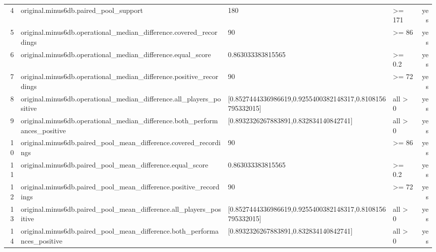 \documentclass{article}
\begin{document}
\begin{longtable}{r p{5cm} p{4cm} p{2.5cm} r}
4 & original.\allowbreak{}minus6db.\allowbreak{}paired\_\allowbreak{}pool\_\allowbreak{}support & 180 & >= 171 & yes \\
5 & original.\allowbreak{}minus6db.\allowbreak{}operational\_\allowbreak{}median\_\allowbreak{}difference.\allowbreak{}covered\_\allowbreak{}recordings & 90 & >= 86 & yes \\
6 & original.\allowbreak{}minus6db.\allowbreak{}operational\_\allowbreak{}median\_\allowbreak{}difference.\allowbreak{}equal\_\allowbreak{}score & 0.\allowbreak{}863033383815565 & >= 0.\allowbreak{}2 & yes \\
7 & original.\allowbreak{}minus6db.\allowbreak{}operational\_\allowbreak{}median\_\allowbreak{}difference.\allowbreak{}positive\_\allowbreak{}recordings & 90 & >= 72 & yes \\
8 & original.\allowbreak{}minus6db.\allowbreak{}operational\_\allowbreak{}median\_\allowbreak{}difference.\allowbreak{}all\_\allowbreak{}players\_\allowbreak{}positive & [0.\allowbreak{}8527444336986619,\allowbreak{}0.\allowbreak{}9255400382148317,\allowbreak{}0.\allowbreak{}8108156795332015] & all > 0 & yes \\
9 & original.\allowbreak{}minus6db.\allowbreak{}operational\_\allowbreak{}median\_\allowbreak{}difference.\allowbreak{}both\_\allowbreak{}performances\_\allowbreak{}positive & [0.\allowbreak{}8932326267883891,\allowbreak{}0.\allowbreak{}832834140842741] & all > 0 & yes \\
10 & original.\allowbreak{}minus6db.\allowbreak{}paired\_\allowbreak{}pool\_\allowbreak{}mean\_\allowbreak{}difference.\allowbreak{}covered\_\allowbreak{}recordings & 90 & >= 86 & yes \\
11 & original.\allowbreak{}minus6db.\allowbreak{}paired\_\allowbreak{}pool\_\allowbreak{}mean\_\allowbreak{}difference.\allowbreak{}equal\_\allowbreak{}score & 0.\allowbreak{}863033383815565 & >= 0.\allowbreak{}2 & yes \\
12 & original.\allowbreak{}minus6db.\allowbreak{}paired\_\allowbreak{}pool\_\allowbreak{}mean\_\allowbreak{}difference.\allowbreak{}positive\_\allowbreak{}recordings & 90 & >= 72 & yes \\
13 & original.\allowbreak{}minus6db.\allowbreak{}paired\_\allowbreak{}pool\_\allowbreak{}mean\_\allowbreak{}difference.\allowbreak{}all\_\allowbreak{}players\_\allowbreak{}positive & [0.\allowbreak{}8527444336986619,\allowbreak{}0.\allowbreak{}9255400382148317,\allowbreak{}0.\allowbreak{}8108156795332015] & all > 0 & yes \\
14 & original.\allowbreak{}minus6db.\allowbreak{}paired\_\allowbreak{}pool\_\allowbreak{}mean\_\allowbreak{}difference.\allowbreak{}both\_\allowbreak{}performances\_\allowbreak{}positive & [0.\allowbreak{}8932326267883891,\allowbreak{}0.\allowbreak{}832834140842741] & all > 0 & yes \\

\end{longtable}
\end{document}
